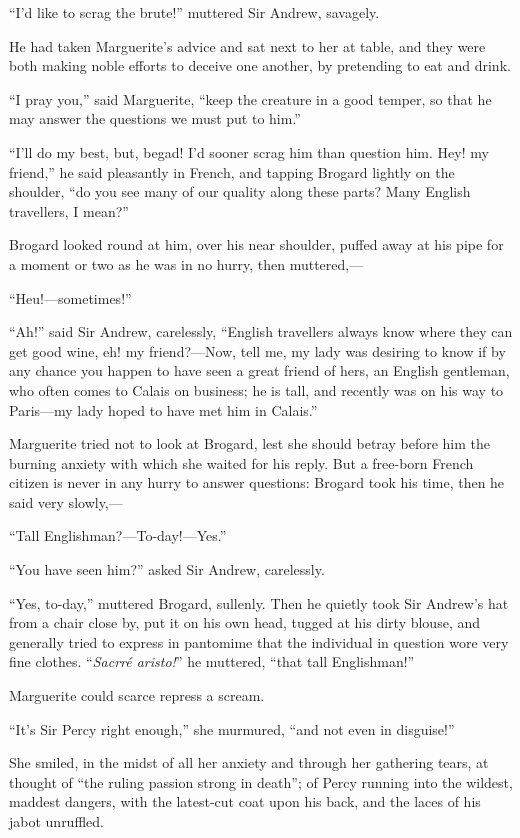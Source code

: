 \documentclass[paper=5.5in:8.5in,BCOR=7mm,twoside,DIV=calc,12pt,usegeometry,chapterprefix,endperiod,headings=big]{scrbook}
\begin{document}
\enquote{I'd like to scrag the brute!} muttered Sir Andrew, savagely.

He had taken Marguerite's advice and sat next to her at table, and they were both making noble efforts to deceive one another, by pretending to eat and drink.

\enquote{I pray you,} said Marguerite, \enquote{keep the creature in a good temper, so that he may answer the questions we must put to him.}

\enquote{I'll do my best, but, begad! I'd sooner scrag him than question him. Hey! my friend,} he said pleasantly in French, and tapping Brogard lightly on the shoulder, \enquote{do you see many of our quality along these parts? Many English travellers, I mean?}

Brogard looked round at him, over his near shoulder, puffed away at his pipe for a moment or two as he was in no hurry, then muttered,---

\enquote{Heu!---sometimes!}

\enquote{Ah!} said Sir Andrew, carelessly, \enquote{English travellers always know where they can get good wine, eh! my friend?---Now, tell me, my lady was desiring to know if by any chance you happen to have seen a great friend of hers, an English gentleman, who often comes to Calais on business; he is tall, and recently was on his way to Paris---my lady hoped to have met him in Calais.}

Marguerite tried not to look at Brogard, lest she should betray before him the burning anxiety with which she waited for his reply. But a free-born French citizen is never in any hurry to answer questions: Brogard took his time, then he said very slowly,---

\enquote{Tall Englishman?---To-day!---Yes.}

\enquote{You have seen him?} asked Sir Andrew, carelessly.

\enquote{Yes, to-day,} muttered Brogard, sullenly. Then he quietly took Sir Andrew's hat from a chair close by, put it on his own head, tugged at his dirty blouse, and generally tried to express in pantomime that the individual in question wore very fine clothes. \enquote{\textit{Sacrré aristo!}} he muttered, \enquote{that tall Englishman!}

Marguerite could scarce repress a scream.

\enquote{It's Sir Percy right enough,} she murmured, \enquote{and not even in disguise!}

She smiled, in the midst of all her anxiety and through her gathering tears, at thought of \enquote{the ruling passion strong in death}; of Percy running into the wildest, maddest dangers, with the latest-cut coat upon his back, and the laces of his jabot unruffled.
\end{document}
